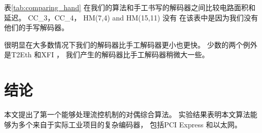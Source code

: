 表\ref{tab:comparing_hand} 在我们的算法和手工书写的解码器之间比较电路面积和延迟。
CC\_3，CC\_4， HM(7,4) and HM(15,11) 没有
在该表中是因为我们没有他们的手写解码器。

很明显在大多数情况下我们的解码器比手工解码器更小也更快。
少数的两个例外是T2Eth 和XFI ，
我们产生的解码器比手工解码器稍微大一些。



\section{结论}\label{sec_conclude_chap3}

本文提出了第一个能够处理流控机制的对偶综合算法。
实验结果表明本文算法能够为多个来自于实际工业项目的复杂编码器，
包括PCI Express  和以太网。


